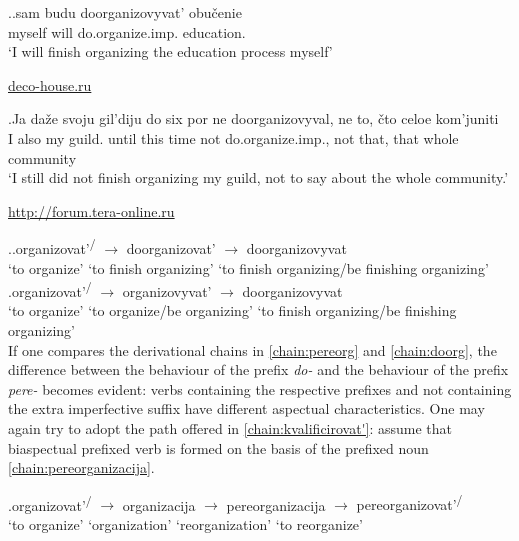\ex.\label{ex:doorganizovyvat}\ag.sam budu doorganizovyvat'\textsuperscript{\IPF} obu\v{c}enie\\
myself will do.organize.imp. education.\\
\trans `I will finish organizing the education process myself'
\begin{flushright}
\vspace{-0.5em}
\url{deco-house.ru}
\end{flushright}
\bg.Ja da\v{z}e svoju gil'diju do six por ne doorganizovyval\textsuperscript{\PF}, ne to, \v{c}to celoe kom'juniti\\
I also my guild. until this time not do.organize.imp., not that, that whole community\\
\trans `I still did not finish organizing my guild, not to say about the whole community.'
\begin{flushright}
\vspace{-0.5em}
 \url{http://forum.tera-online.ru}
\end{flushright}

\ex.\label{chain:doorg}\ag.organizovat'\textsuperscript{\PF\slash\IPF} {$\rightarrow$} {doorganizovat'\textsuperscript{\PF}} {$\rightarrow$} doorganizovyvat\textsuperscript{\IPF}\\
{`to organize'} {} {`to finish organizing'} {} {`to finish organizing/be finishing organizing'}\\
\bg.organizovat'\textsuperscript{\PF\slash\IPF} {$\rightarrow$} {organizovyvat'\textsuperscript{\IPF}} {$\rightarrow$} doorganizovyvat\textsuperscript{\PF}\\
{`to organize'} {} {`to organize/be organizing'} {} {`to finish organizing/be finishing organizing'}\\

If one compares the derivational chains in \ref{chain:pereorg} and \ref{chain:doorg}, the difference between the behaviour of the prefix \textit{do-} and the behaviour of the prefix \textit{pere-} becomes evident: verbs containing the respective prefixes and not containing the extra imperfective suffix have different aspectual characteristics. One may again try to adopt the path offered in \ref{chain:kvalificirovat'}: assume that biaspectual prefixed verb is formed on the basis of the prefixed noun \ref{chain:pereorganizacija}.
 
\exg.\label{chain:pereorganizacija}organizovat'\textsuperscript{\PF\slash\IPF} {$\rightarrow$} organizacija {$\rightarrow$} pereorganizacija {$\rightarrow$} {pereorganizovat'\textsuperscript{\PF\slash\IPF}}\\
{`to organize'} {} `organization' {} `reorganization' {} {`to reorganize'}\\

